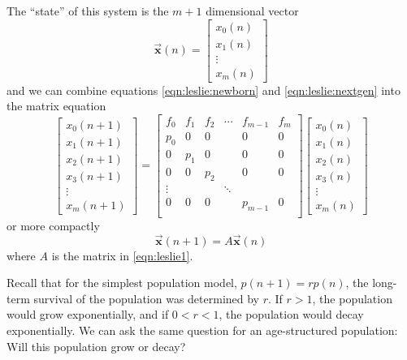 \documentclass[reqno]{immbook}
\newcommand{\BX}{\vec{\textbf{x}}}
\numberwithin{equation}{chapter}
\numberwithin{question}{section}
\numberwithin{theorem}{chapter}
\numberwithin{figure}{chapter}
\theoremstyle{definition}
\begin{document}
The ``state'' of this system is the $m+1$ dimensional
vector
\begin{equation}
  \BX(n) = \begin{bmatrix} x_0(n) \\ x_1(n) \\ \vdots \\x_m(n)
           \end{bmatrix}
\end{equation}
and we can combine equations \eqref{eqn:leslie:newborn}
and \eqref{eqn:leslie:nextgen} into the matrix equation
\begin{equation}
   \begin{bmatrix}
      x_0(n+1) \\ x_1(n+1) \\ x_2(n+1) \\ x_3(n+1) \\ \vdots \\x_m(n+1)
   \end{bmatrix}
    =
   \begin{bmatrix}
      f_0 & f_1 &  f_2 & \cdots & f_{m-1} & f_m \\
      p_0 &  0  &   0  &        &  0      &  0  \\
       0  & p_1 &   0  &        &  0      &  0  \\
       0  &  0  &  p_2  &       &  0      &  0  \\
       \vdots & & & \ddots \\
       0 &  0  &   0  & & p_{m-1} & 0 \\
   \end{bmatrix}
   \begin{bmatrix}
       x_0(n) \\ x_1(n) \\ x_2(n) \\ x_3(n) \\ \vdots \\x_m(n)
   \end{bmatrix}
\label{eqn:leslie1}
\end{equation}
or more compactly
\begin{equation}
   \BX(n+1) = A\BX(n)
\end{equation}
where $A$ is the matrix in \eqref{eqn:leslie1}.

Recall that for the simplest population model, $p(n+1) = rp(n)$,
the long-term survival of the population was determined 
by $r$. If $r > 1$, the population would grow exponentially,
and if $0 < r < 1$, the population would decay exponentially.
We can ask the same question for an age-structured population:
Will this population grow or decay?
\end{document}
